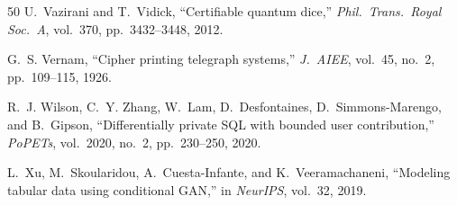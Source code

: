 \documentclass[acmsmall,screen,review,anonymous]{acmart}
\begin{document}
\begin{thebibliography}{50}
U.~Vazirani and T.~Vidick, ``Certifiable quantum dice,'' \emph{Phil.\ Trans.\ Royal Soc.\ A}, vol.~370, pp.~3432--3448, 2012.

G.~S. Vernam, ``Cipher printing telegraph systems,'' \emph{J.\ AIEE}, vol.~45, no.~2, pp.~109--115, 1926.

R.~J. Wilson, C.~Y. Zhang, W.~Lam, D.~Desfontaines, D.~Simmons-Marengo, and B.~Gipson, ``Differentially private {SQL} with bounded user contribution,'' \emph{PoPETs}, vol.~2020, no.~2, pp.~230--250, 2020.

L.~Xu, M.~Skoularidou, A.~Cuesta-Infante, and K.~Veeramachaneni, ``Modeling tabular data using conditional {GAN},'' in \emph{NeurIPS}, vol.~32, 2019.

\end{thebibliography}
\end{document}

